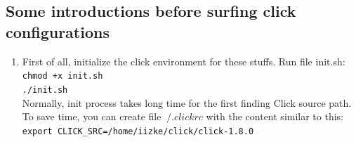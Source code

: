 \documentclass[a4paper]{article}
\begin{document}
    \subsection{Some introductions before surfing click configurations}
      \begin{enumerate}
      	\item 
      	  First of all, initialize the click environment for these stuffs. Run file init.sh: \\
      	    \texttt{chmod +x init.sh\\
      	    ./init.sh}\\
      	  Normally, init process takes long time for the first finding Click source
  path. To save time, you can create file $~/.clickrc$ with the content similar
  to this:\\
            \texttt{export CLICK\_SRC=/home/iizke/click/click-1.8.0}
        

\end{enumerate}
\end{document}
